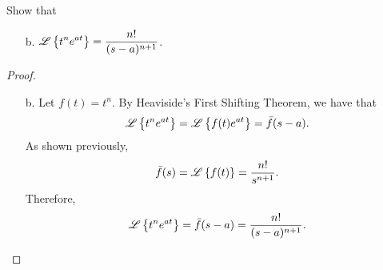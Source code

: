 \begin{problem}{3.15}
  Show that
  \begin{enumerate}
    \item[b.] $\displaystyle \mathscr{L}\left\{ {t^n e^{at}} \right\} = \frac{n!}{(s-a)^{n+1}}$.
  \end{enumerate}
\end{problem}

\begin{proof}
  \begin{enumerate}
    \item[b.]
      Let $f(t) = t^n$. By Heaviside's First Shifting Theorem, we have that
      \begin{align*}
        \mathscr{L}\left\{ {t^n e^{at}} \right\} = \mathscr{L}\left\{ {f(t)e^{at}} \right\} = \bar{f}(s-a).
      \end{align*}
      As shown previously,
      \begin{align*}
        \bar{f}(s) = \mathscr{L}\left\{ {f(t)} \right\} = \frac{n!}{s^{n+1}}.
      \end{align*}
      Therefore,
      \begin{align*}
        \mathscr{L}\left\{ {t^n e^{at}} \right\} = \bar{f}(s-a) = \frac{n!}{(s-a)^{n+1}}.
      \end{align*}
  \end{enumerate}
\end{proof}
\newpage
